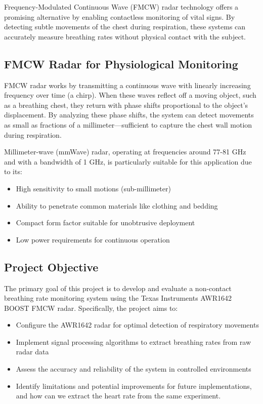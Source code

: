 \documentclass[12pt]{article}
\begin{document}
Frequency-Modulated Continuous Wave (FMCW) radar technology offers a promising alternative by enabling contactless monitoring of vital signs. By detecting subtle movements of the chest during respiration, these systems can accurately measure breathing rates without physical contact with the subject.

\subsection{FMCW Radar for Physiological Monitoring}
FMCW radar works by transmitting a continuous wave with linearly increasing frequency over time (a chirp). When these waves reflect off a moving object, such as a breathing chest, they return with phase shifts proportional to the object's displacement. By analyzing these phase shifts, the system can detect movements as small as fractions of a millimeter—sufficient to capture the chest wall motion during respiration.

Millimeter-wave (mmWave) radar, operating at frequencies around 77-81 GHz and with a bandwidth of 1 GHz, is particularly suitable for this application due to its:
\begin{itemize}
    \item High sensitivity to small motions (sub-millimeter)
    \item Ability to penetrate common materials like clothing and bedding
    \item Compact form factor suitable for unobtrusive deployment
    \item Low power requirements for continuous operation
\end{itemize}

\subsection{Project Objective}
The primary goal of this project is to develop and evaluate a non-contact breathing rate monitoring system using the Texas Instruments AWR1642 BOOST FMCW radar. Specifically, the project aims to:
\begin{itemize}
    \item Configure the AWR1642 radar for optimal detection of respiratory movements
    \item Implement signal processing algorithms to extract breathing rates from raw radar data
    \item Assess the accuracy and reliability of the system in controlled environments
    \item Identify limitations and potential improvements for future implementations, and how can we extract the heart rate from the same experiment.
\end{itemize}
\end{document}
